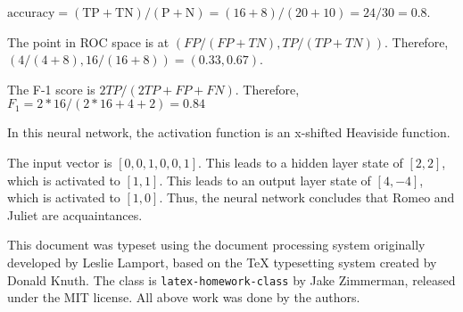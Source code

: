 \documentclass[11pt,largemargins, anonymous]{homework}
\begin{document}
\clearpage
\maketitle
\clearpage

\question

\begin{alphaparts}
    \questionpart
    $ \mathrm{accuracy} = (\mathrm{TP + TN}) / (\mathrm{P + N}) = (16 + 8) / (20 + 10) = 24/30 = 0.8$.

    \questionpart
    The point in ROC space is at $\left ( FP / (FP + TN) , TP / (TP + TN) \right )$.
    Therefore, $ ( 4 / (4 + 8) , 16 / (16 + 8) ) = (0.33, 0.67)$.

    \questionpart
    The F-1 score is $2 TP / (2 TP + FP + FN)$.
    Therefore, $F_1 = 2 * 16 / (2 * 16 + 4 + 2) = 0.84$
\end{alphaparts}

\question
In this neural network, the activation function is an x-shifted Heaviside function.

\begin{alphaparts}
    \questionpart
    The input vector is $[0, 0, 1, 0, 0, 1]$.
    This leads to a hidden layer state of $[2, 2]$, which is activated to
    $[1, 1]$.
    This leads to an output layer state of $[4, -4]$, which is activated to $[1, 0]$.
    Thus, the neural network concludes that Romeo and Juliet are acquaintances.
\end{alphaparts}

\begin{colophon}
    This document was typeset using the \LaTeXe{} document processing system
    originally developed by Leslie Lamport, based on the \TeX{} typesetting system
    created by Donald Knuth.
    The class is \texttt{latex-homework-class} by Jake Zimmerman,
    released under the MIT license.
    All above work was done by the authors.
\end{colophon}
\end{document}
